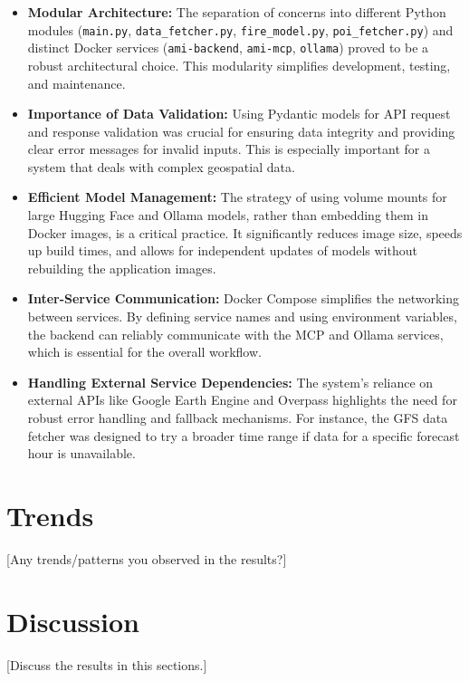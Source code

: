 \documentclass[lang=english,inputenc=utf8,fontsize=10pt]{ldvarticle}
\begin{document}
\begin{itemize}
    \item \textbf{Modular Architecture:} The separation of concerns into different Python modules (\texttt{main.py}, \texttt{data\_fetcher.py}, \texttt{fire\_model.py}, \texttt{poi\_fetcher.py}) and distinct Docker services (\texttt{ami-backend}, \texttt{ami-mcp}, \texttt{ollama}) proved to be a robust architectural choice. This modularity simplifies development, testing, and maintenance.
    \item \textbf{Importance of Data Validation:} Using Pydantic models for API request and response validation was crucial for ensuring data integrity and providing clear error messages for invalid inputs. This is especially important for a system that deals with complex geospatial data.
    \item \textbf{Efficient Model Management:} The strategy of using volume mounts for large Hugging Face and Ollama models, rather than embedding them in Docker images, is a critical practice. It significantly reduces image size, speeds up build times, and allows for independent updates of models without rebuilding the application images.
    \item \textbf{Inter-Service Communication:} Docker Compose simplifies the networking between services. By defining service names and using environment variables, the backend can reliably communicate with the MCP and Ollama services, which is essential for the overall workflow.
    \item \textbf{Handling External Service Dependencies:} The system's reliance on external APIs like Google Earth Engine and Overpass highlights the need for robust error handling and fallback mechanisms. For instance, the GFS data fetcher was designed to try a broader time range if data for a specific forecast hour is unavailable.
\end{itemize}

\section*{Trends}
[Any trends/patterns you observed in the results?] 

\lipsum[15]

\newpage

\section{Discussion}
[Discuss the results in this sections.] 
\end{document}
